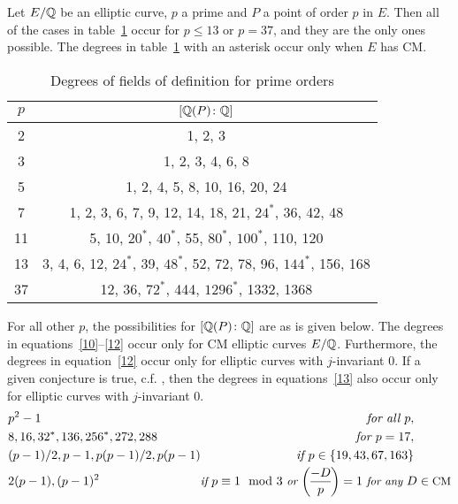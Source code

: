 \begin{thm} \label{thm:fielddefodd}
Let $E/\mathbb{Q}$ be an elliptic curve, $p$ a prime and $P$ a point of order $p$ in $E$. Then all of the cases in table~\ref{tab:degreetab} occur for $p \leq 13$ or $p= 37$, and they are the only ones possible. The degrees in table~\ref{tab:degreetab} with an asterisk occur only when $E$ has CM.
	\begin{table}[!ht]
	\centering
	\caption{Degrees of fields of definition for prime orders\label{tab:degreetab}}
	\begin{tabular}{|c|c|} \hline
	$p$ & $[\mathbb{Q}(P) \colon \mathbb{Q}]$ \\ \hline
	2 & 1, 2, 3 \\ \hline
	3 & 1, 2, 3, 4, 6, 8 \\ \hline
	5 & 1, 2, 4, 5, 8, 10, 16, 20, 24 \\ \hline
	7 & 1, 2, 3, 6, 7, 9, 12, 14, 18, 21, $24^*$, 36, 42, 48 \\ \hline
	11 & 5, 10, $20^*$, $40^*$, 55, $80^*$, $100^*$, 110, 120 \\ \hline
	13 & 3, 4, 6, 12, $24^*$, 39, $48^*$, 52, 72, 78, 96, $144^*$, 156, 168 \\ \hline
	37 & 12, 36, $72^*$, 444, $1296^*$, 1332, 1368 \\ \hline
	\end{tabular}
	\end{table}
For all other $p$, the possibilities for $[\mathbb{Q}(P) \colon \mathbb{Q}]$ are as is given below. The degrees in equations~\ref{10}--\ref{12} occur only for CM elliptic curves $E/\mathbb{Q}$. Furthermore, the degrees in equation~\ref{12} occur only for elliptic curves with $j$-invariant 0. If a given conjecture is true, c.f. \cite[Conj.~3.5]{gonzalezjimeneznajman20base}, then the degrees in equations~\ref{13} also occur only for elliptic curves with $j$-invariant 0.
	\begin{align}
	\pushleft{p^2 - 1} & \pushright{\text{\itshape for all } p,\quad\quad\quad}  \label{8} \\
	\pushleft{8, 16, 32^*, 136, 256^*, 272, 288} & \pushright{\text{\itshape for } p= 17,\quad\quad\quad} \label{9} \\
	\pushleft{(p - 1)/2, p - 1, p(p - 1)/2, p(p - 1)} & \pushright{\text{\itshape if } p \in \{ 19, 43, 67, 163 \}\quad\quad\quad} \label{10} \\
	\pushleft{2(p - 1), (p - 1)^2} & {\small \text{\itshape if } p \equiv 1 \mod 3 \text{\itshape\ or } \genfrac(){}{0}{-D}{p}= 1 \text{\itshape\ for any } D \in \text{CM} }\label{11} \\

\end{align}
\end{thm}

